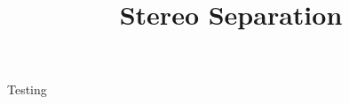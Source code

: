 \documentclass[12pt]{article}
\title{Stereo Separation}
\date{}
\begin{document}
Testing
\end{document}
